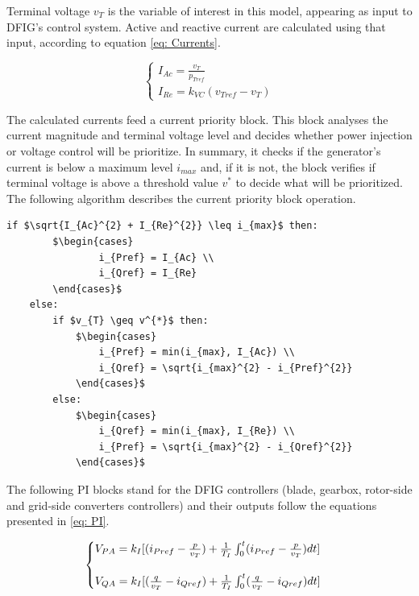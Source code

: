 Terminal voltage $v_{T}$ is the variable of interest in this model, appearing as input to DFIG's control system. Active and reactive current are calculated using that input, according to equation \eqref{eq: Currents}.

\begin{equation}
	\begin{cases}
		I_{Ac} = \frac{v_{T}}{p_{Tref}} \\
		I_{Re} = k_{VC}(v_{Tref} - v_{T})
	\end{cases}
	\label{eq: Currents}
\end{equation}

The calculated currents feed a current priority block. This block analyses the current magnitude and terminal voltage level and decides whether power injection or voltage control will be prioritize. In summary, it checks if the generator's current is below a maximum level $i_{max}$ and, if it is not, the block verifies if terminal voltage is above a threshold value $v^{*}$ to decide what will be prioritized. The following algorithm describes the current priority block operation.

\begin{center}
	\begin{lstlisting}[mathescape, columns=fullflexible]
	if $\sqrt{I_{Ac}^{2} + I_{Re}^{2}} \leq i_{max}$ then:
		$\begin{cases}
				i_{Pref} = I_{Ac} \\
				i_{Qref} = I_{Re}
		\end{cases}$
	else:
		if $v_{T} \geq v^{*}$ then:	
			$\begin{cases}
				i_{Pref} = min(i_{max}, I_{Ac}) \\
				i_{Qref} = \sqrt{i_{max}^{2} - i_{Pref}^{2}}
			\end{cases}$
		else:
			$\begin{cases}
				i_{Qref} = min(i_{max}, I_{Re}) \\
				i_{Pref} = \sqrt{i_{max}^{2} - i_{Qref}^{2}}
			\end{cases}$
	\end{lstlisting}
\end{center}

The following PI blocks stand for the DFIG controllers (blade, gearbox, rotor-side and grid-side converters controllers) and their outputs follow the equations presented in \eqref{eq: PI}.

\begin{equation}
	\begin{cases}
		V_{PA} = k_{I}[(i_{Pref} - \frac{p}{v_{T}}) +\frac{1}{T_{I}}\int\displaylimits_{0}^{t}	(i_{Pref} - \frac{p}{v_{T}})dt]\\
		\\
		V_{QA} = k_{I}[(\frac{q}{v_{T}} - i_{Qref}) +\frac{1}{T_{I}}\int\displaylimits_{0}^{t}	(\frac{q}{v_{T}} - i_{Qref})dt]
	\end{cases}
	\label{eq: PI}
\end{equation}

